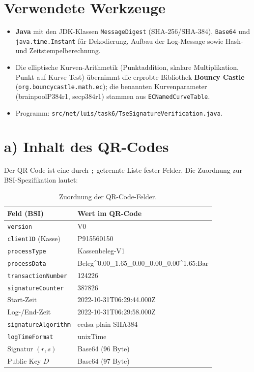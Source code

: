 \documentclass[
    fontsize=12pt,          %
    paper=a4,               %
    numbers=noenddot,       %
    listof=totoc,           %
    listof=entryprefix,     %
    listof=nochaptergap,    %
    bibliography=totoc,     %
    parskip=half,           %
    openany                 %
]{scrbook}
\begin{document}
\section*{Verwendete Werkzeuge}

\begin{itemize}
    \item \textbf{Java} mit den JDK-Klassen \texttt{MessageDigest} (SHA-256/SHA-384), \texttt{Base64}
          und \texttt{java.time.Instant} für Dekodierung, Aufbau der Log-Message sowie Hash- und
          Zeitstempelberechnung.
    \item Die elliptische Kurven-Arithmetik (Punktaddition, skalare Multiplikation, Punkt-auf-Kurve-Test)
          übernimmt die erprobte Bibliothek \textbf{Bouncy Castle} (\texttt{org.bouncyc\-astle.math.ec});
          die benannten Kurvenparameter (brainpoolP384r1, secp384r1) stammen aus
          \texttt{ECNamedCurveTable}.
    \item Programm: \texttt{src/net/luis/task6/TseSignatureVerification.java}.
\end{itemize}


\section*{a) Inhalt des QR-Codes}

Der QR-Code ist eine durch \texttt{;} getrennte Liste fester Felder.
Die Zuordnung zur BSI-Spezifikation lautet:

\begin{table}[H]
    \centering
    \small
    \begin{tabular}{l l}
        \toprule
        \textbf{Feld (BSI)}            & \textbf{Wert im QR-Code} \\
        \midrule
        \texttt{version}               & V0 \\
        \texttt{clientID} (Kasse)      & P915560150 \\
        \texttt{processType}           & Kassenbeleg-V1 \\
        \texttt{processData}           & Beleg\^{}0.00\_1.65\_0.00\_0.00\_0.00\^{}1.65:Bar \\
        \texttt{transactionNumber}     & 124226 \\
        \texttt{signatureCounter}      & 387826 \\
        Start-Zeit                     & 2022-10-31T06:29:44.000Z \\
        Log-/End-Zeit                  & 2022-10-31T06:29:58.000Z \\
        \texttt{signatureAlgorithm}    & ecdsa-plain-SHA384 \\
        \texttt{logTimeFormat}         & unixTime \\
        Signatur $(r,s)$               & Base64 (96 Byte) \\
        Public Key $D$                 & Base64 (97 Byte) \\
        \bottomrule
    \end{tabular}
    \caption{Zuordnung der QR-Code-Felder.}
\end{table}
\end{document}
